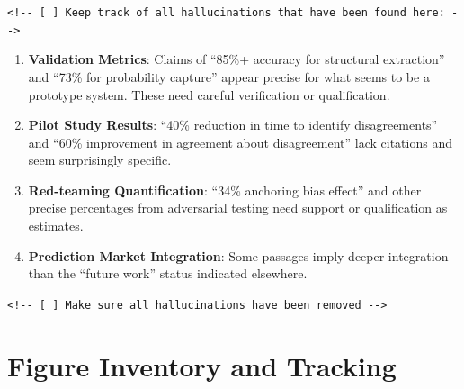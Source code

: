 \documentclass[
  11pt,
  letterpaper,
]{book}
\begin{document}
\texttt{\textless{}!-\/-\ {[}\ {]}\ Keep\ track\ of\ all\ hallucinations\ that\ have\ been\ found\ here:\ -\/-\textgreater{}}

\begin{enumerate}
\def\labelenumi{\arabic{enumi}.}
\item
  \textbf{Validation Metrics}: Claims of ``85\%+ accuracy for structural
  extraction'' and ``73\% for probability capture'' appear precise for
  what seems to be a prototype system. These need careful verification
  or qualification.
\item
  \textbf{Pilot Study Results}: ``40\% reduction in time to identify
  disagreements'' and ``60\% improvement in agreement about
  disagreement'' lack citations and seem surprisingly specific.
\item
  \textbf{Red-teaming Quantification}: ``34\% anchoring bias effect''
  and other precise percentages from adversarial testing need support or
  qualification as estimates.
\item
  \textbf{Prediction Market Integration}: Some passages imply deeper
  integration than the ``future work'' status indicated elsewhere.
\end{enumerate}

\texttt{\textless{}!-\/-\ {[}\ {]}\ Make\ sure\ all\ hallucinations\ have\ been\ removed\ -\/-\textgreater{}}

\section{Figure Inventory and
Tracking}\label{figure-inventory-and-tracking}
\end{document}
